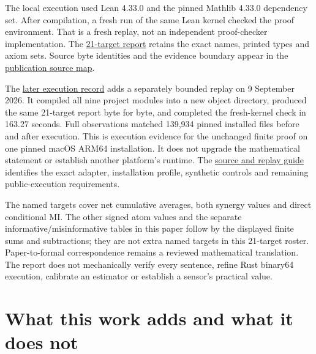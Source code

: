 The local execution used Lean 4.33.0 and the pinned Mathlib 4.33.0 dependency set. After compilation, a fresh run of the same Lean kernel checked the proof environment. That is a fresh replay, not an independent proof-checker implementation. The \href{https://github.com/sepahead/pid-rs/blob/main/audit/evidence/mgw-fixed-world-added-information-2026-09-09/target-report.json}{21-target report} retains the exact names, printed types and axiom sets. Source byte identities and the evidence boundary appear in the \href{https://github.com/sepahead/pid-rs/blob/main/audit/evidence/mgw-fixed-world-added-information-2026-09-09/source-map.json}{publication source map}.

The \href{https://github.com/sepahead/pid-rs/blob/main/audit/formal/lean-mgw-fixed-world/LATER_EXECUTION.json}{later execution record} adds a separately bounded replay on 9 September 2026. It compiled all nine project modules into a new object directory, produced the same 21-target report byte for byte, and completed the fresh-kernel check in 163.27 seconds. Full observations matched 139,934 pinned installed files before and after execution. This is execution evidence for the unchanged finite proof on one pinned macOS ARM64 installation. It does not upgrade the mathematical statement or establish another platform's runtime. The \href{https://github.com/sepahead/pid-rs/blob/main/audit/formal/lean-mgw-fixed-world/EVIDENCE.md}{source and replay guide} identifies the exact adapter, installation profile, synthetic controls and remaining public-execution requirements.

The named targets cover net cumulative averages, both synergy values and direct conditional MI. The other signed atom values and the separate informative/misinformative tables in this paper follow by the displayed finite sums and subtractions; they are not extra named targets in this 21-target roster. Paper-to-formal correspondence remains a reviewed mathematical translation. The report does not mechanically verify every sentence, refine Rust binary64 execution, calibrate an estimator or establish a sensor's practical value.

\par{}

\section{What this work adds and what it does not}\label{what-this-work-adds-and-what-it-does-not}

